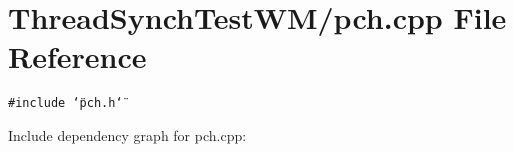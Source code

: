 \section{Thread\-Synch\-Test\-WM/pch.cpp File Reference}
\label{_m_2pch_8cpp}
{\tt \#include \char`\"{}pch.h\char`\"{}}\par


Include dependency graph for pch.cpp:
